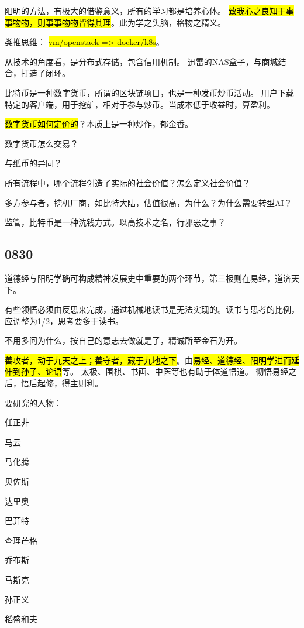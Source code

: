 阳明的方法，有极大的借鉴意义，所有的学习都是培养心体。
\hl{致我心之良知于事事物物，则事事物物皆得其理}。此为学之头脑，格物之精义。

类推思维： \hl{vm/openstack => docker/k8s}。

从技术的角度看，是分布式存储，包含信用机制。
迅雷的NAS盒子，与商城结合，打造了闭环。

比特币是一种数字货币，所谓的区块链项目，也是一种发币炒币活动。
用户下载特定的客户端，用于挖矿，相对于参与炒币。当成本低于收益时，算盈利。

\begin{enumbox}
\item \hl{数字货币如何定价的}？本质上是一种炒作，郁金香。
\item 数字货币怎么交易？
\item 与纸币的异同？
\end{enumbox}

所有流程中，哪个流程创造了实际的社会价值？怎么定义社会价值？

多方参与者，挖机厂商，如比特大陆，估值很高，为什么？为什么需要转型AI？

监管，比特币是一种洗钱方式。以高技术之名，行邪恶之事？

\subsection{0830}

道德经与阳明学确可构成精神发展史中重要的两个环节，第三极则在易经，道济天下。

有些领悟必须由反思来完成，通过机械地读书是无法实现的。读书与思考的比例，应调整为1/2，思考要多于读书。

不用多问为什么，按自己的意志去做就是了，精诚所至金石为开。

\hl{善攻者，动于九天之上；善守者，藏于九地之下}。由\hl{易经、道德经、阳明学进而延伸到孙子、论语}等。
太极、围棋、书画、中医等也有助于体道悟道。 彻悟易经之后，悟后起修，得主则利。

要研究的人物：
\begin{enumbox}
\item 任正非
\item 马云
\item 马化腾
\item 贝佐斯
\item 达里奥
\item 巴菲特
\item 查理芒格
\item 乔布斯
\item 马斯克
\item 孙正义
\item 稻盛和夫
\end{enumbox}

